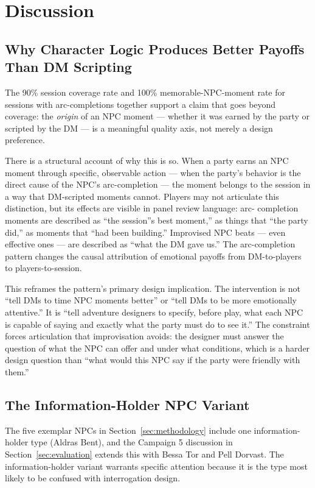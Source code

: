 
\section{Discussion}
\label{sec:discussion}

\subsection{Why Character Logic Produces Better Payoffs Than DM Scripting}

The 90\% session coverage rate and 100\% memorable-NPC-moment rate for
sessions with arc-completions together support a claim that goes beyond
coverage: the \textit{origin} of an NPC moment --- whether it was earned
by the party or scripted by the DM --- is a meaningful quality axis, not
merely a design preference.

There is a structural account of why this is so. When a party earns an NPC
moment through specific, observable action --- when the party's behavior is
the direct cause of the NPC's arc-completion --- the moment belongs to the
session in a way that DM-scripted moments cannot. Players may not articulate
this distinction, but its effects are visible in panel review language: arc-
completion moments are described as ``the session''s best moment,'' as things
that ``the party did,'' as moments that ``had been building.'' Improvised NPC
beats --- even effective ones --- are described as ``what the DM gave us.''
The arc-completion pattern changes the causal attribution of emotional payoffs
from DM-to-players to players-to-session.

This reframes the pattern's primary design implication. The intervention is
not ``tell DMs to time NPC moments better'' or ``tell DMs to be more
emotionally attentive.'' It is ``tell adventure designers to specify, before
play, what each NPC is capable of saying and exactly what the party must do
to see it.'' The constraint forces articulation that improvisation avoids: the
designer must answer the question of what the NPC can offer and under what
conditions, which is a harder design question than ``what would this NPC say
if the party were friendly with them.''

\subsection{The Information-Holder NPC Variant}

The five exemplar NPCs in Section~\ref{sec:methodology} include one
information-holder type (Aldras Bent), and the Campaign 5 discussion in
Section~\ref{sec:evaluation} extends this with Bessa Tor and Pell Dorvast.
The information-holder variant warrants specific attention because it is
the type most likely to be confused with interrogation design.

